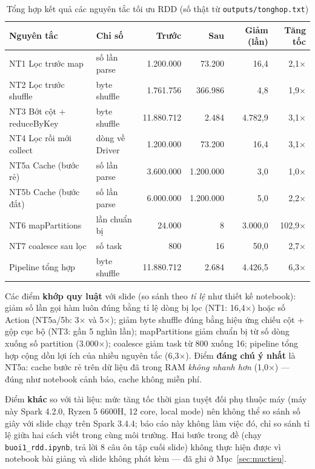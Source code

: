 \documentclass[12pt,a4paper,oneside]{article}
\begin{document}
\begin{table}[H]
\centering
\caption{Tổng hợp kết quả các nguyên tắc tối ưu RDD (số thật từ \texttt{outputs/tonghop.txt})}
\label{tab:tonghop}
\begin{tabularx}{\textwidth}{l X r r r r}
\toprule
Nguyên tắc & Chỉ số & Trước & Sau & Giảm (lần) & Tăng tốc \\
\midrule
NT1 Lọc trước map & số lần parse & 1.200.000 & 73.200 & 16,4 & 2,1$\times$ \\
NT2 Lọc trước shuffle & byte shuffle & 1.761.756 & 366.986 & 4,8 & 1,9$\times$ \\
NT3 Bớt cột + reduceByKey & byte shuffle & 11.880.712 & 2.484 & 4.782,9 & 3,1$\times$ \\
NT4 Lọc rồi mới collect & dòng về Driver & 1.200.000 & 73.200 & 16,4 & 3,1$\times$ \\
NT5a Cache (bước rẻ) & số lần parse & 3.600.000 & 1.200.000 & 3,0 & 1,0$\times$ \\
NT5b Cache (bước đắt) & số lần parse & 6.000.000 & 1.200.000 & 5,0 & 2,2$\times$ \\
NT6 mapPartitions & lần chuẩn bị & 24.000 & 8 & 3.000,0 & 102,9$\times$ \\
NT7 coalesce sau lọc & số task & 800 & 16 & 50,0 & 2,7$\times$ \\
Pipeline tổng hợp & byte shuffle & 11.880.712 & 2.684 & 4.426,5 & 6,3$\times$ \\
\bottomrule
\end{tabularx}
\end{table}

Các điểm \textbf{khớp quy luật} với slide (so sánh theo \emph{tỉ lệ} như thiết kế notebook): giảm số lần gọi hàm luôn đúng bằng tỉ lệ dòng bị lọc (NT1: 16,4$\times$) hoặc số Action (NT5a/5b: 3$\times$ và 5$\times$); giảm byte shuffle đúng bằng hiệu ứng chiếu cột + gộp cục bộ (NT3: gần 5 nghìn lần); mapPartitions giảm chuẩn bị từ số dòng xuống số partition (3.000$\times$); coalesce giảm task từ 800 xuống 16; pipeline tổng hợp cộng dồn lợi ích của nhiều nguyên tắc (6,3$\times$). Điểm \textbf{đáng chú ý nhất} là NT5a: cache bước rẻ trên dữ liệu đã trong RAM \emph{không nhanh hơn} (1,0$\times$) --- đúng như notebook cảnh báo, cache không miễn phí.

Điểm \textbf{khác} so với tài liệu: mức tăng tốc thời gian tuyệt đối phụ thuộc máy (máy này Spark 4.2.0, Ryzen 5 6600H, 12 core, local mode) nên không thể so sánh số giây với slide chạy trên Spark 3.4.4; báo cáo này không làm việc đó, chỉ so sánh tỉ lệ giữa hai cách viết trong cùng môi trường. Hai bước trong đề (chạy \texttt{buoi1\_rdd.ipynb}, trả lời 8 câu ôn tập cuối slide) không thực hiện được vì notebook bài giảng và slide không phát kèm --- đã ghi ở Mục~\ref{sec:muctieu}.
\end{document}
